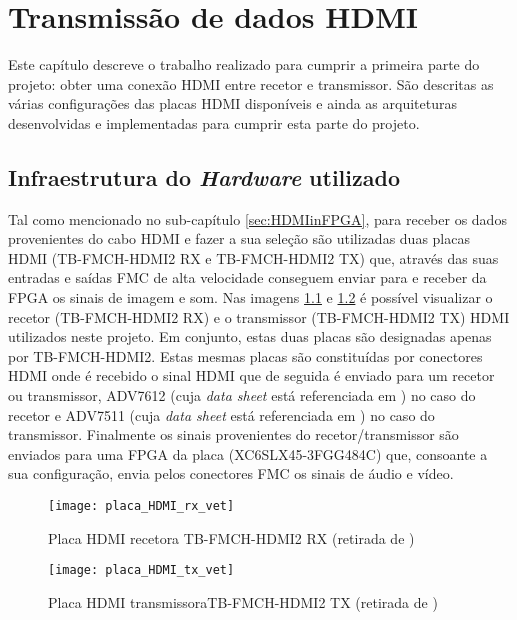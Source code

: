 \chapter{Transmissão de dados HDMI}\label{chap:chap3}

Este capítulo descreve o trabalho realizado para cumprir a primeira parte do projeto: obter uma conexão HDMI entre recetor e transmissor. São descritas as várias configurações das placas HDMI disponíveis e ainda as arquiteturas desenvolvidas e implementadas para cumprir esta parte do projeto. 

\section{Infraestrutura do \textit{Hardware} utilizado} \label{sec:hardware}

Tal como mencionado no sub-capítulo \ref{sec:HDMIinFPGA}, para receber os dados provenientes do cabo HDMI e fazer a sua seleção são utilizadas duas placas HDMI (TB-FMCH-HDMI2 RX e TB-FMCH-HDMI2 TX) que, através das suas entradas e saídas FMC de alta velocidade conseguem enviar para e receber da FPGA os sinais de imagem e som. Nas imagens \ref{fig:rx} e \ref{fig:tx} é possível visualizar o recetor (TB-FMCH-HDMI2 RX) e o transmissor (TB-FMCH-HDMI2 TX) HDMI utilizados neste projeto. Em conjunto, estas duas placas são designadas apenas por TB-FMCH-HDMI2. Estas mesmas placas são constituídas por conectores HDMI onde é recebido o sinal HDMI que de seguida é enviado para um recetor ou transmissor, ADV7612 (cuja \textit{data sheet} está referenciada em \cite{R038}) no caso do recetor e ADV7511 (cuja \textit{data sheet} está referenciada em \cite{R039}) no caso do transmissor. Finalmente os sinais provenientes do recetor/transmissor são enviados para uma FPGA da placa (XC6SLX45-3FGG484C) que, consoante a sua configuração, envia pelos conectores FMC os sinais de áudio e vídeo.

\begin{figure}[h!]
	\begin{center}
		\leavevmode
		\texttt{[image: placa\_HDMI\_rx\_vet]}
		\caption[Placa HDMI recetora TB-FMCH-HDMI2 RX]{Placa HDMI recetora TB-FMCH-HDMI2 RX (retirada de \cite{R009})}
		\label{fig:rx}
	\end{center}
\end{figure}

\begin{figure}[h!]
	\begin{center}
		\leavevmode
		\texttt{[image: placa\_HDMI\_tx\_vet]}
		\caption[Placa HDMI transmissora TB-FMCH-HDMI2 TX]{Placa HDMI transmissoraTB-FMCH-HDMI2 TX (retirada de \cite{R009})}
		\label{fig:tx}
	\end{center}
\end{figure}


